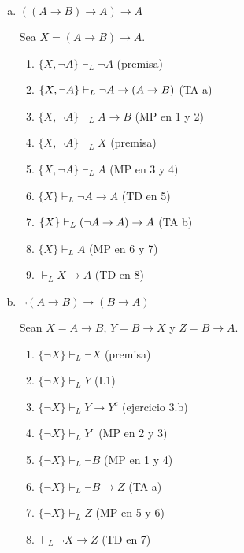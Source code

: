 \begin{enumerate}[(a)]
    \item $((A \to B) \to A) \to A$
    \begin{solution}
    Sea $X = (A \to B) \to A$.
    \begin{enumerate}[1.]
        \item $\{ X, \neg A \} \vdash_L \neg A$  \hfill (premisa)
        \item $\{ X, \neg A \} \vdash_L \neg A \to (A \to B)$  \hfill (TA a)
        \item $\{ X, \neg A \} \vdash_L A \to B$ \hfill (MP en 1 y 2)
        \item $\{ X, \neg A \} \vdash_L X$       \hfill (premisa)
        \item $\{ X, \neg A \} \vdash_L A$       \hfill (MP en 3 y 4)
        \item $\{ X \} \vdash_L \neg A \to A$    \hfill (TD en 5)
        \item $\{ X \} \vdash_L (\neg A \to A) \to A$           \hfill (TA b)
        \item $\{ X \} \vdash_L A$               \hfill (MP en 6 y 7)
        \item $\vdash_L X \to A$                 \hfill (TD en 8)
    \end{enumerate}
    \end{solution}
    
    \item $\neg (A \to B) \to (B \to A)$
    \begin{solution}
    Sean $X = A \to B$, $Y = B \to X$ y $Z = B \to A$.
    \begin{enumerate}[1.]
        \item $\{ \neg X \} \vdash_L \neg X$       \hfill (premisa)
        \item $\{ \neg X \} \vdash_L Y$            \hfill (L1)
        \item $\{ \neg X \} \vdash_L Y \to Y^c$    \hfill (ejercicio 3.b)
        \item $\{ \neg X \} \vdash_L Y^c$          \hfill (MP en 2 y 3)
        \item $\{ \neg X \} \vdash_L \neg B$       \hfill (MP en 1 y 4)
        \item $\{ \neg X \} \vdash_L \neg B \to Z$ \hfill (TA a)
        \item $\{ \neg X \} \vdash_L Z$            \hfill (MP en 5 y 6)
        \item $\vdash_L \neg X \to Z$              \hfill (TD en 7)
    \end{enumerate}
    \end{solution}
\end{enumerate}

